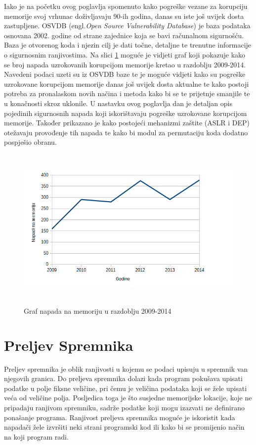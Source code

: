 \documentclass[times, utf8, diplomski, numeric]{fer}
\begin{document}
Iako je na početku ovog poglavlja spomenuto kako pogreške vezane za korupciju memorije svoj vrhunac doživljavaju 90-ih godina, danas su iste još uvijek dosta zastupljene. OSVDB (engl.\emph{Open Source Vulnerability Database}) je baza podataka osnovana 2002. godine od strane zajednice koja se bavi računalnom sigurnošću. Baza je otvorenog koda i njezin cilj je dati točne, detaljne te trenutne informacije o sigurnosnim ranjivostima. Na slici \ref{fig:mem_corruption} moguće je vidjeti graf koji pokazuje kako se broj napada uzrokovanih korupcijom memorije kretao u razdoblju 2009-2014. Navedeni podaci uzeti su iz OSVDB baze te je moguće vidjeti kako su pogreške uzrokovane korupcijom memorije danas još uvijek dosta aktualne te kako postoji potreba za pronalaskom novih načina i metoda kako bi se te prijetnje smanjile te u konačnosti skroz uklonile. U nastavku ovog poglavlja dan je detaljan opis pojedinih sigurnosnih napada koji iskorištavaju pogreške uzrokovane korupcijom memorije. Također prikazano je kako postojeći mehanizmi zaštite (ASLR i DEP) otežavaju provođenje tih napada te kako bi modul za permutaciju koda dodatno pospješio obranu. 

\pagebreak
\begin{figure}[!ht]
\centering
\setlength\fboxsep{0pt}
\setlength\fboxrule{0.5pt}
\includegraphics[width=12cm, height=8cm]{slike/memory_corruption}
\caption{Graf napada na memoriju u razdoblju 2009-2014}
\label{fig:mem_corruption} 
\end{figure} 

\section{Preljev Spremnika}
\label{sct:bufferOverflow}
Preljev spremnika je oblik ranjivosti u kojemu se podaci upisuju u spremnik van njegovih granica. Do preljeva spremnika dolazi kada program pokušava upisati podatke u polje fiksne veličine, pri čemu je veličina podataka koji se žele upisati veća od veličine polja. Posljedica toga je što susjedne memorijske lokacije, koje ne pripadaju ranjivom spremniku, sadrže podatke koji mogu izazvati ne definirano ponašanje programa. Ranjivost preljeva spremnika moguće je iskoristit kada napadači žele izvršiti neki strani programski kod ili kako bi se promijenio način na koji program radi. 
\end{document}
